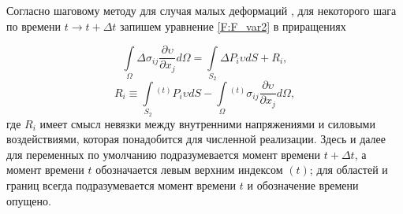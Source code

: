 \documentclass[]{article}
\begin{document}
Согласно шаговому методу для случая малых деформаций \cite{Zienkiewicz1975,Frolov1995}, для некоторого шага по времени $t\longrightarrow t+\Delta t$ запишем уравнение \eqref{F:F_var2} в приращениях

\begin{equation}
\int\limits_{\Omega}\Delta\sigma_{ij}\frac{\partial\upsilon}{\partial x_j} d\Omega=\int\limits_{S_{2}}\Delta P_{i} \upsilon dS + R_{i},
\label{F:F_var3}
\end{equation}
\begin{equation}
R_{i} \equiv \int\limits_{S_{2}}{}^{(t)}P_{i} \upsilon dS - \int\limits_{\Omega}{}^{(t)}\sigma_{ij}\frac{\partial\upsilon}{\partial x_j} d\Omega,
\label{F:F_var3_add}
\end{equation}
где $R_{i}$ имеет смысл невязки между внутренними напряжениями и силовыми воздействиями, которая понадобится для численной реализации. Здесь и далее для переменных по умолчанию подразумевается момент времени $t+\Delta t$, а момент времени $t$ обозначается левым верхним индексом $(t)$; для областей и границ всегда подразумевается момент времени $t$ и обозначение времени опущено.
\end{document}
